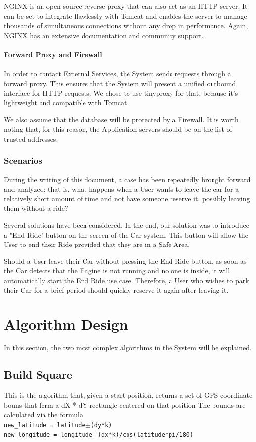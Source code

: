 \documentclass[12pt]{article}
\begin{document}
NGINX is an open source reverse proxy that can also act as an HTTP server. It can be set to integrate flawlessly with Tomcat and enables the server to manage thousands of simultaneous connections without any drop in performance. Again, NGINX has an extensive documentation and community support.

\paragraph{Forward Proxy and Firewall}
In order to contact External Services, the System sends requests through a forward proxy. This ensures that the System will present a unified outbound interface for HTTP requests. We chose to use tinyproxy for that, because it's lightweight and compatible with Tomcat.

We also assume that the database will be protected by a Firewall. It is worth noting that, for this reason, the Application servers should be on the list of trusted addresses.

\subsubsection{Scenarios}
During the writing of this document, a case has been repeatedly brought forward and analyzed: that is, what happens when a User wants to leave the car for a relatively short amount of time and not have someone reserve it, possibly leaving them without a ride?

Several solutions have been considered. In the end, our solution was to introduce a "End Ride" button on the screen of the Car system. This button will allow the User to end their Ride provided that they are in a Safe Area.

Should a User leave their Car without pressing the End Ride button, as soon as the Car detects that the Engine is not running and no one is inside, it will automatically start the End Ride use case. Therefore, a User who wishes to park their Car for a brief period should quickly reserve it again after leaving it.

\clearpage
\section{Algorithm Design}
In this section, the two most complex algorithms in the System will be explained.
\subsection{Build Square}
This is the algorithm that, given a start position, returns a set of GPS coordinate bouns that form a dX * dY rectangle centered on that position
The bounds are calculated via the formula\\
\verb&new_latitude = latitude&$\pm$\verb&(dy*k)&\\
\verb&new_longitude = longitude&$\pm$\verb&(dx*k)/cos(latitude*pi/180)&
\end{document}
